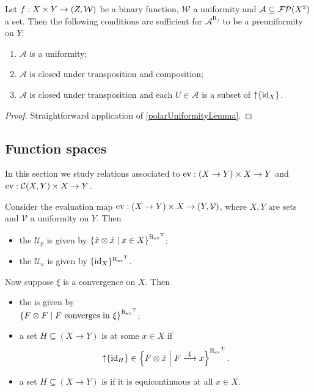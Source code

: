 \begin{proposition}
Let $f: X\times Y\to \left( Z, \mathcal{W} \right)$ be a binary function, $\mathcal{W}$ a uniformity and $\mathcal{A}\subseteq \operatorname{\mathcal{FP}}(X^2)$ a set.
Then the following conditions are sufficient for $\mathcal{A}^{\mathrm{R}_{f}}$ to be a preuniformity on $Y$:
\begin{enumerate}
\item $\mathcal{A}$ is a uniformity;
\item $\mathcal{A}$ is closed under transposition and composition;
\item $\mathcal{A}$ is closed under transposition and each $U\in \mathcal{A}$ is a subset of $\operatorname{\uparrow}\{\operatorname{id}_X\}$.
\end{enumerate}
\end{proposition}
\begin{proof}
Straightforward application of \ref{polarUniformityLemma}.
\end{proof}


\subsection{Function spaces}
In this section we study relations associated to $\operatorname{ev}: (X\to Y) \times X \to Y$ and $\operatorname{ev}: \operatorname{\mathcal{C}}(X, Y) \times X \to Y$.

\begin{definition}
Consider the evaluation map $\operatorname{ev}: (X\to Y)\times X \to \left( Y,\mathcal{V} \right)$, where $X, Y$ are sets and $\mathcal{V}$ a uniformity on $Y$. Then
\begin{itemize}
\item the  $\mathcal{U}_p$ is given by $\left\{ \dot{x}\otimes\dot{x} \;\middle|\; x\in X \right\}^{\mathrel{\mathrm{R}_{\operatorname{ev}}}^{\mathrm{T}}}$;
\item the  $\mathcal{U}_u$ is given by $\{\operatorname{id}_X\}^{\mathrel{\mathrm{R}_{\operatorname{ev}}}^{\mathrm{T}}}$.
\end{itemize}
Now suppose $\xi$ is a convergence on $X$. Then
\begin{itemize}
\item the  is given by \\ $\left\{ F\otimes F \;\middle|\; \text{$F$ converges in $\xi$} \right\}^{\mathrel{\mathrm{R}_{\operatorname{ev}}}^{\mathrm{T}}}$;
\item a set $H\subseteq (X\to Y)$ is  at some $x\in X$ if
\[ \operatorname{\uparrow}\{\operatorname{id}_H\} \in \left\{ F\otimes \dot{x} \;\middle|\; F\overset{\xi}{\longrightarrow}x \right\}^{\mathrel{\mathrm{R}_{\operatorname{ev}}}^{\mathrm{T}}}. \]
\item a set $H\subseteq (X\to Y)$ is  if it is equicontinuous at all $x\in X$.
\end{itemize}
\end{definition}


